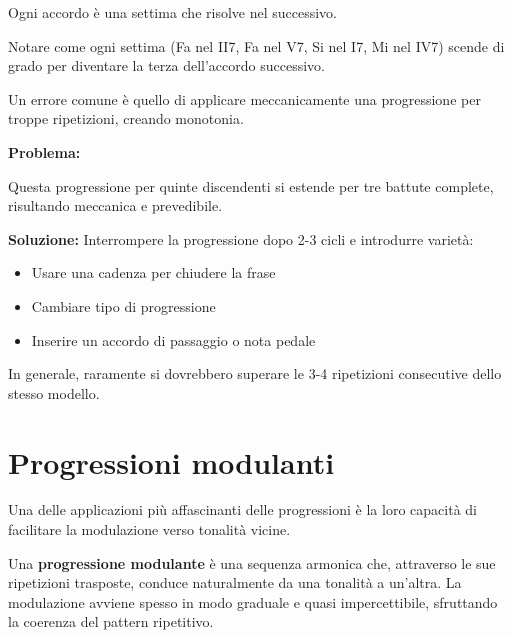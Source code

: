 \begin{esempio}
	\label{ex:progressione_settime}
	Ogni accordo è una settima che risolve nel successivo.
	
	Notare come ogni settima (Fa nel II7, Fa nel V7, Si nel I7, Mi nel IV7) scende di grado per diventare la terza dell'accordo successivo.
\end{esempio}

\begin{errore}
	\label{err:progressioni_lunghe}
	Un errore comune è quello di applicare meccanicamente una progressione per troppe ripetizioni, creando monotonia. 
	
	\textbf{Problema:}
	
	Questa progressione per quinte discendenti si estende per tre battute complete, risultando meccanica e prevedibile.
	
	\textbf{Soluzione:}
	Interrompere la progressione dopo 2-3 cicli e introdurre varietà:
	\begin{itemize}
		\item Usare una cadenza per chiudere la frase
		\item Cambiare tipo di progressione
		\item Inserire un accordo di passaggio o nota pedale
	\end{itemize}
	
	In generale, raramente si dovrebbero superare le 3-4 ripetizioni consecutive dello stesso modello.
\end{errore}

\section{Progressioni modulanti}
\label{sec:progressioni_modulanti}

Una delle applicazioni più affascinanti delle progressioni è la loro capacità di facilitare la modulazione verso tonalità vicine.

\begin{definizione}
	\label{def:progressione_modulante}
	Una \textbf{progressione modulante} è una sequenza armonica che, attraverso le sue ripetizioni trasposte, conduce naturalmente da una tonalità a un'altra. La modulazione avviene spesso in modo graduale e quasi impercettibile, sfruttando la coerenza del pattern ripetitivo.
\end{definizione}

